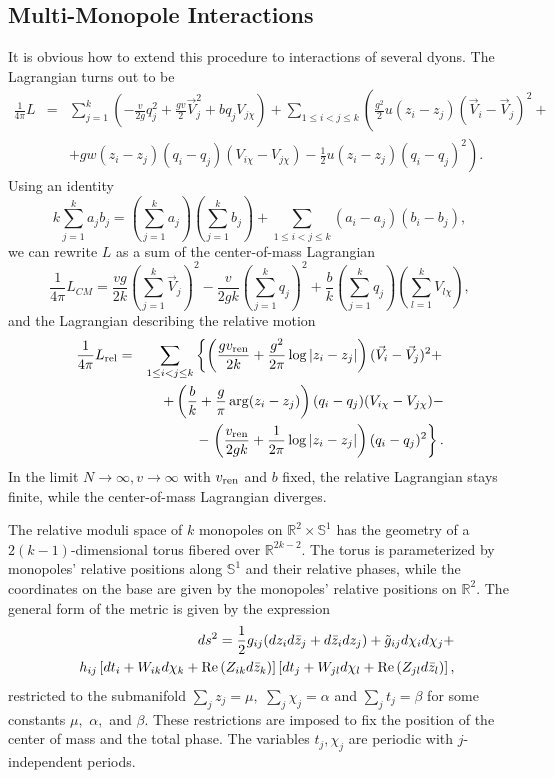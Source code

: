 \documentclass[a4paper,12pt, amsfonts, amssymb]{article}
\newcommand{\RR}{{\mathbb R}}
\renewcommand{\SS}{{\mathbb S}}
\newcommand{\ra}{\rightarrow}
\newcommand{\V}{{\vec{V}}}
\newcommand{\nn}{\nonumber}
\newcommand{\vr}{v_{{\rm ren}}}
\begin{document}
\subsection{Multi-Monopole Interactions}
It is obvious how to extend this procedure to interactions of several dyons.  The Lagrangian turns out to be
\begin{eqnarray}
\frac{1}{4\pi}L&=&\sum_{j=1}^k\left(-\frac{v}{2g}q_j^2+\frac{gv}{2}\vec{V}_j^2+b q_jV_{j\chi}\right)+\sum_{1\leq i< j\leq k}
\left(\frac{g^2}{2}u(z_i-z_j)(\V_i-\V_j)^2+\right.\nn\\
&&+\left.g w(z_i-z_j)(q_i-q_j)(V_{i\chi}-V_{j\chi})-\frac{1}{2} u(z_i-z_j)(q_i-q_j)^2\right).\nn
\end{eqnarray}
Using an identity
\begin{equation}
k\sum_{j=1}^k a_j b_j=\left(\sum_{j=1}^k a_j\right)\left(\sum_{j=1}^k b_j\right)+\sum_{1\leq i< j\leq k} (a_i-a_j)(b_i-b_j),
\end{equation}
we can rewrite $L$ as a sum of the center-of-mass  Lagrangian
\begin{equation}
\frac{1}{4\pi}L_{CM}= \frac{vg}{2k}\left(\sum_{j=1}^k
\vec{V}_j\right)^2-\frac{v}{2gk}\left(\sum_{j=1}^k
q_j\right)^2+\frac{b}{k}\left(\sum_{j=1}^k q_j\right)\left(\sum_{l=1}^k V_{l\chi}\right),
\end{equation}
and the Lagrangian describing the relative motion
\begin{eqnarray}\label{all}
\frac{1}{4\pi}L_{{\rm rel}}&=&\sum_{1\leq i< j\leq k}
\left\{\left(\frac{g\vr}{2k}+\frac{g^2}{2\pi}\log|z_i-z_j|\right)
(\V_i-\V_j)^2+\right.\nn\\
&&+\left(\frac{b}{k}+\frac{g}{\pi}\arg(z_i-z_j)\right)
(q_i-q_j)(V_{i\chi}-V_{j\chi})-\\
&&-\left.\left(\frac{\vr}{2gk}+\frac{1}{2\pi}\log|z_i-z_j|\right)
(q_i-q_j)^2\right\}.\nn
\end{eqnarray}
In the limit $N\ra\infty,v\ra\infty$ with $\vr$ and $b$ fixed, the
relative Lagrangian stays finite, while the center-of-mass Lagrangian
diverges.

The relative moduli space of $k$ monopoles on $\RR^2\times\SS^1$ has
the geometry of a $2(k-1)$-dimensional torus fibered over $\RR^{2k-2}$.
The torus is parameterized by monopoles' relative positions along $\SS^1$ and their relative phases, while the coordinates on the base are given by the monopoles' relative positions on $\RR^2$. The general form of the metric is
given by the expression
\begin{eqnarray}\label{fibre}
&&ds^2=\frac{1}{2}g_{ij}(dz_id\bar{z}_j+d\bar{z}_idz_j)+
\tilde{g}_{ij}d\chi_i d\chi_j+\\
&&h_{ij}\left[dt_i+W_{ik} d\chi_k+{\rm Re}\left(Z_{ik}d\bar{z}_k\right)\right]
\left[dt_j+W_{jl}d\chi_l+{\rm Re}\left(Z_{jl}d\bar{z}_l\right)\right],\nn
\end{eqnarray}
restricted to the submanifold $\sum_j z_j=\mu,$ $\sum_j\chi_j=\alpha$ and $\sum_j t_j=\beta$ for some constants $\mu,$
$\alpha,$ and $\beta.$ These restrictions are imposed to fix the position of the center of mass and the total phase. The variables $t_j,\chi_j$
are periodic with $j$-independent periods.
\end{document}
